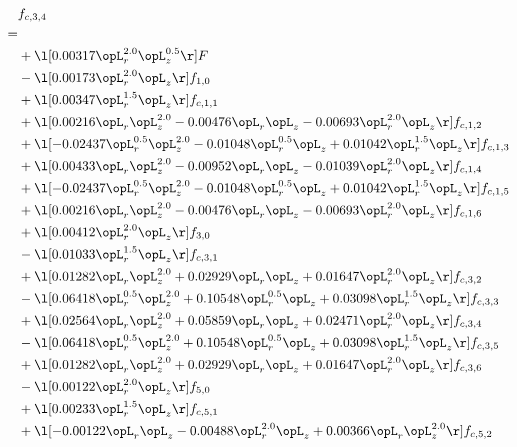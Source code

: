 \begin{alignat}{2} 
\label{eq:f_34_1} 
& f_{c,3,4} \nonumber \\ 
 = \\ 
& + \l[  0.00317 \opL_r^{2.0} \opL_z^{0.5}  \r] F \nonumber \\ 
& - \l[  0.00173 \opL_r^{2.0} \opL_z  \r] f_{1,0} \nonumber \\ 
& + \l[  0.00347 \opL_r^{1.5} \opL_z  \r] f_{c,1,1} \nonumber \\ 
& + \l[  0.00216 \opL_r \opL_z^{2.0}   -0.00476 \opL_r \opL_z   -0.00693 \opL_r^{2.0} \opL_z  \r] f_{c,1,2} \nonumber \\ 
& + \l[  -0.02437 \opL_r^{0.5} \opL_z^{2.0}   -0.01048 \opL_r^{0.5} \opL_z +  0.01042 \opL_r^{1.5} \opL_z  \r] f_{c,1,3} \nonumber \\ 
& + \l[  0.00433 \opL_r \opL_z^{2.0}   -0.00952 \opL_r \opL_z   -0.01039 \opL_r^{2.0} \opL_z  \r] f_{c,1,4} \nonumber \\ 
& + \l[  -0.02437 \opL_r^{0.5} \opL_z^{2.0}   -0.01048 \opL_r^{0.5} \opL_z +  0.01042 \opL_r^{1.5} \opL_z  \r] f_{c,1,5} \nonumber \\ 
& + \l[  0.00216 \opL_r \opL_z^{2.0}   -0.00476 \opL_r \opL_z   -0.00693 \opL_r^{2.0} \opL_z  \r] f_{c,1,6} \nonumber \\ 
& + \l[  0.00412 \opL_r^{2.0} \opL_z  \r] f_{3,0} \nonumber \\ 
& - \l[  0.01033 \opL_r^{1.5} \opL_z  \r] f_{c,3,1} \nonumber \\ 
& + \l[  0.01282 \opL_r \opL_z^{2.0} +  0.02929 \opL_r \opL_z +  0.01647 \opL_r^{2.0} \opL_z  \r] f_{c,3,2} \nonumber \\ 
& - \l[  0.06418 \opL_r^{0.5} \opL_z^{2.0} +  0.10548 \opL_r^{0.5} \opL_z +  0.03098 \opL_r^{1.5} \opL_z  \r] f_{c,3,3} \nonumber \\ 
& + \l[  0.02564 \opL_r \opL_z^{2.0} +  0.05859 \opL_r \opL_z +  0.02471 \opL_r^{2.0} \opL_z  \r] f_{c,3,4} \nonumber \\ 
& - \l[  0.06418 \opL_r^{0.5} \opL_z^{2.0} +  0.10548 \opL_r^{0.5} \opL_z +  0.03098 \opL_r^{1.5} \opL_z  \r] f_{c,3,5} \nonumber \\ 
& + \l[  0.01282 \opL_r \opL_z^{2.0} +  0.02929 \opL_r \opL_z +  0.01647 \opL_r^{2.0} \opL_z  \r] f_{c,3,6} \nonumber \\ 
& - \l[  0.00122 \opL_r^{2.0} \opL_z  \r] f_{5,0} \nonumber \\ 
& + \l[  0.00233 \opL_r^{1.5} \opL_z  \r] f_{c,5,1} \nonumber \\ 
& + \l[  -0.00122 \opL_r \opL_z   -0.00488 \opL_r^{2.0} \opL_z +  0.00366 \opL_r \opL_z^{2.0}  \r] f_{c,5,2} \nonumber \\ 

\end{alignat}

